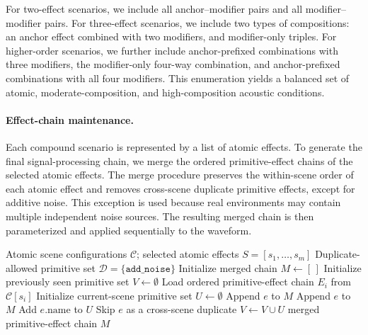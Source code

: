 \documentclass{article}
\begin{document}
For two-effect scenarios, we include all anchor--modifier pairs and all
modifier--modifier pairs. For three-effect scenarios, we include two types of
compositions: an anchor effect combined with two modifiers, and modifier-only
triples. For higher-order scenarios, we further include anchor-prefixed
combinations with three modifiers, the modifier-only four-way combination, and
anchor-prefixed combinations with all four modifiers. This enumeration yields a
balanced set of atomic, moderate-composition, and high-composition acoustic
conditions.

\paragraph{Effect-chain maintenance.}
Each compound scenario is represented by a list of atomic effects. To generate
the final signal-processing chain, we merge the ordered primitive-effect chains
of the selected atomic effects. The merge procedure preserves the within-scene
order of each atomic effect and removes cross-scene duplicate primitive effects,
except for additive noise. This exception is used because real environments may
contain multiple independent noise sources. The resulting merged chain is then
parameterized and applied sequentially to the waveform.

\begin{algorithm}[t]
\caption{Effect-chain maintenance for compound acoustic scenarios}
\label{alg:effect_chain_maintenance}
\begin{algorithmic}[1]
\Require Atomic scene configurations $\mathcal{C}$; selected atomic effects $S=[s_1,\ldots,s_m]$
\Require Duplicate-allowed primitive set $\mathcal{D}=\{\texttt{add\_noise}\}$
\State Initialize merged chain $M \leftarrow [\,]$
\State Initialize previously seen primitive set $V \leftarrow \emptyset$
    \State Load ordered primitive-effect chain $E_i$ from $\mathcal{C}[s_i]$
    \State Initialize current-scene primitive set $U \leftarrow \emptyset$
            \State Append $e$ to $M$
            \State Append $e$ to $M$
            \State Add $e.\mathrm{name}$ to $U$
        \Else
            \State Skip $e$ as a cross-scene duplicate
        \EndIf
    \EndFor
    \State $V \leftarrow V \cup U$
\EndFor
\State \Return merged primitive-effect chain $M$
\end{algorithmic}
\end{algorithm}
\end{document}
